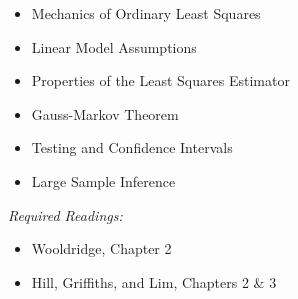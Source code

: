 \documentclass{article}
\begin{document}
\begin{itemize}
\item Mechanics of Ordinary Least Squares
\item Linear Model Assumptions
\item Properties of the Least Squares Estimator
\item Gauss-Markov Theorem
\item Testing and Confidence Intervals
\item Large Sample Inference
\end{itemize}
\textit{Required Readings:} \begin{itemize}
  \item Wooldridge, Chapter 2
  \item  Hill, Griffiths, and Lim, Chapters 2 \& 3 
\end{itemize}



\end{document}
